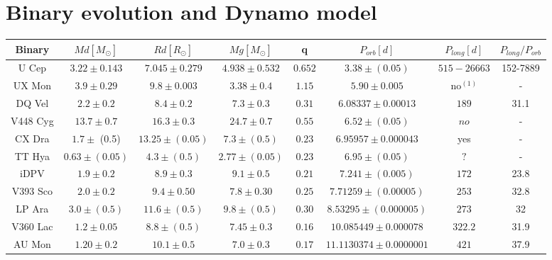 \section{Binary evolution and Dynamo model}
\begin{table}
\centering
\begin{tabular}{c c c c c c c c}
\hline
\hline
  Binary & 
$Md[M_{\odot}]$&$Rd[R_{\odot}]$&$Mg[M_{\odot}]$&q&$P_{orb}[d]$&$P_{long}[d]$&$P_{long}/P_{orb}$\\
\hline
    U Cep   & $3.22\pm 0.143$ & $7.045\pm 0.279$ & $4.938\pm 0.532$ & $0.652$ & $3.38\pm (0.05)$ & $515-26663$&152-7889\\
   
   UX Mon   & $3.9\pm 0.29$ & $9.8\pm 0.003$ & $3.38\pm 0.4$ & $1.15$ & $5.90\pm 0.005$ & no$^{(1)}$&- \\
   
   DQ Vel   & $2.2\pm 0.2$ & $8.4\pm 0.2$ &$7.3\pm 0.3$& $0.31$ &$6.08337\pm 0.00013$&$189$&31.1 \\
   
   V448 Cyg & $13.7\pm 0.7$ & $16.3\pm 0.3$ & $24.7\pm 0.7$ & $0.55$ & $6.52\pm (0.05)$ & $no$&-\\
   
   CX Dra  & $1.7\pm$ (0.5)& $13.25\pm (0.05)$ & $7.3\pm (0.5)$& $0.23$&$6.95957\pm 0.000043$&yes&- \\
   
   TT Hya  & $0.63\pm (0.05)$ & $4.3\pm (0.5)$ & $2.77\pm (0.05)$ & $0.23$ & $6.95\pm (0.05)$ & $?$&-\\
   
   iDPV    & $1.9\pm 0.2$ & $8.9\pm 0.3$ & $9.1\pm 0.5$ & $0.21$ &$7.241\pm (0.005)$ &$172$&23.8 \\
   
   V393 Sco& $2.0\pm 0.2$ & $9.4\pm 0.50$ & $7.8\pm 0.30$ & $0.25$ & $7.71259\pm (0.00005)$ & $253$&32.8 \\
   
   LP Ara  & $3.0\pm (0.5)$ &$11.6\pm (0.5)$ &$9.8\pm (0.5)$ &$0.30$ &$8.53295\pm(0.000005)$ & $273$&32 \\
   
   V360 Lac& $1.2\pm 0.05$ & $8.8\pm (0.5)$ & $7.45\pm 0.3$ & $0.16$ & $10.085449\pm 0.000078$ & $322.2$&31.9 \\
   
   AU Mon  & $1.20\pm 0.2$ & $10.1\pm0.5$ & $7.0\pm 0.3$ & $0.17$ & $11.1130374\pm 0.0000001$ & $421$ &37.9 \\
   

\end{tabular}
\end{table}
